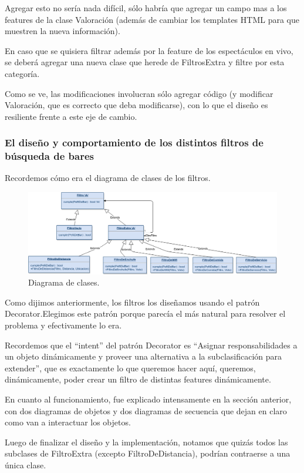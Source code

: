 Agregar esto no sería nada difícil, sólo habría que agregar un campo mas a los features de la clase Valoración (además de cambiar los templates HTML para que muestren la nueva información).

En caso que se quisiera filtrar además por la feature de los espectáculos en vivo, se deberá agregar una nueva clase que herede de FiltrosExtra y filtre por esta categoría.

Como se ve, las modificaciones involucran sólo agregar código (y modificar Valoración, que es correcto que deba modificarse), con lo que el diseño es resiliente frente a este eje de cambio.

\subsubsection{El diseño y comportamiento de los distintos filtros de búsqueda de bares}

Recordemos cómo era el diagrama de clases de los filtros.

\begin{figure}[H]
  \centering
  \includegraphics[width=\textwidth]{diagramas/filtro_clases.png}
  \caption{\normalfont Diagrama de clases.}
\end{figure}


Como dijimos anteriormente, los filtros los diseñamos usando el patrón Decorator.Elegimos este patrón porque parecía el más natural para resolver el problema y efectivamente lo era.

Recordemos que el ``intent'' del patrón Decorator es ``Asignar responsabilidades a un objeto dinámicamente y proveer una alternativa a la subclasificación para extender'', que es exactamente lo que queremos hacer aquí, queremos, dinámicamente, poder crear un filtro de distintas features dinámicamente.

En cuanto al funcionamiento, fue explicado intensamente en la sección anterior, con dos diagramas de objetos y dos diagramas de secuencia que dejan en claro como van a interactuar los objetos.

Luego de finalizar el diseño y la implementación, notamos que quizás todos las subclases de FiltroExtra (excepto FiltroDeDistancia), podrían contraerse a una única clase. 

